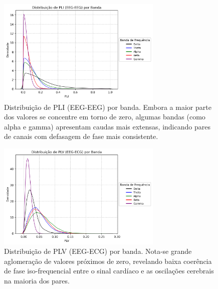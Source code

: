 \begin{figure}[htb]
    \centering
    \includegraphics[width=0.7\textwidth]{figs/3_1_connectivity_metrics/Distribuição_de_PLI_(EEG-EEG)_por_Banda.png}
    \caption{Distribuição de PLI (EEG-EEG) por banda. Embora a maior parte dos valores se concentre em torno de zero, algumas bandas (como alpha e gamma) apresentam caudas mais extensas, indicando pares de canais com defasagem de fase mais consistente.}
    \label{fig:pli_eeg_eeg}
\end{figure}

\begin{figure}[htb]
    \centering
    \includegraphics[width=0.7\textwidth]{figs/3_1_connectivity_metrics/Distribuição_de_PLV_(EEG-ECG)_por_Banda.png}
    \caption{Distribuição de PLV (EEG-ECG) por banda. Nota-se grande aglomeração de valores próximos de zero, revelando baixa coerência de fase iso-frequencial entre o sinal cardíaco e as oscilações cerebrais na maioria dos pares.}
    \label{fig:plv_eeg_ecg}
\end{figure}

